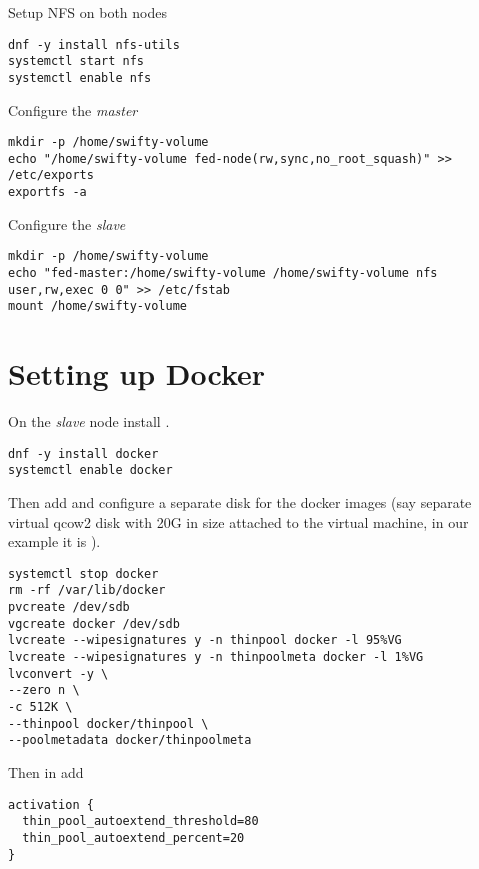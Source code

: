 Setup NFS on both nodes

\begin{lstlisting}
dnf -y install nfs-utils
systemctl start nfs
systemctl enable nfs
\end{lstlisting}

Configure the \emph{master}

\begin{lstlisting}
mkdir -p /home/swifty-volume
echo "/home/swifty-volume fed-node(rw,sync,no_root_squash)" >> /etc/exports
exportfs -a
\end{lstlisting}

Configure the \emph{slave}

\begin{lstlisting}
mkdir -p /home/swifty-volume
echo "fed-master:/home/swifty-volume /home/swifty-volume nfs user,rw,exec 0 0" >> /etc/fstab
mount /home/swifty-volume
\end{lstlisting}

\section{Setting up Docker}
\label{sec:setup-docker}

On the \emph{slave} node install .

\begin{lstlisting}
dnf -y install docker
systemctl enable docker
\end{lstlisting}

Then add and configure a separate disk for the docker images
(say separate virtual qcow2 disk with 20G in size attached to
the virtual machine, in our example it is ).

\begin{lstlisting}
systemctl stop docker
rm -rf /var/lib/docker
pvcreate /dev/sdb
vgcreate docker /dev/sdb
lvcreate --wipesignatures y -n thinpool docker -l 95%VG
lvcreate --wipesignatures y -n thinpoolmeta docker -l 1%VG
lvconvert -y \
--zero n \
-c 512K \
--thinpool docker/thinpool \
--poolmetadata docker/thinpoolmeta
\end{lstlisting}

Then in  add

\begin{lstlisting}
activation {
  thin_pool_autoextend_threshold=80
  thin_pool_autoextend_percent=20
}
\end{lstlisting}

